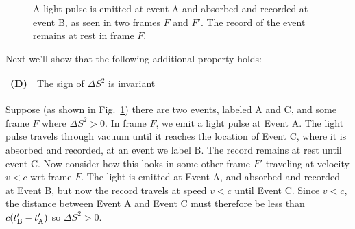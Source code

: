 \documentclass[12pt]{article}
\begin{document}
\begin{figure}[htbp]
\begin{center}
\end{center}
\caption{\label{fig:abctex} A light pulse is emitted at event A and absorbed and recorded at event B, as seen in two frames $F$ and $F'$.  The record of the event remains at rest in frame $F$.}
\end{figure}

Next we'll show that the following additional property holds:
\begin{center}
\begin{tabular}{ll}
{\bf (D)} & The sign of $\Delta S^2$ is invariant \\
\end{tabular}
\end{center}
Suppose (as shown in Fig.~\ref{fig:abctex}) there are two events,
labeled A and C, and some frame $F$ where $\Delta S^2>0$. In frame
$F$, we emit a light pulse at Event A.  The light pulse travels
through vacuum until it reaches the location of Event C, where it is
absorbed and recorded, at an event we label B.  The record remains at
rest until event C.  Now consider how this looks in some other frame
$F'$ traveling at velocity $v<c$ wrt frame $F$.  The light is emitted
at Event A, and absorbed and recorded at Event B, but now the record
travels at speed $v<c$ until Event C.  Since $v < c$, the distance
between Event A and Event C must therefore be less than $c(t'_{\rm
  B}-t'_{\rm A})$ so $\Delta S^2 > 0$.
\end{document}
